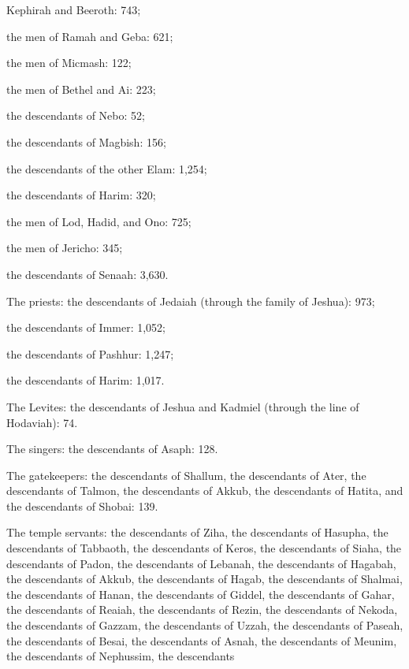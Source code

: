 {Kephirah
and Beeroth: 743;
\par }{\PP {}the men
of Ramah
and Geba: 621;
\par }{\PP {}the men
of Micmash: 122;
\par }{\PP {}the men
of Bethel
and Ai: 223;
\par }{\PP {}the descendants
of Nebo: 52;
\par }{\PP {}the descendants
of Magbish: 156;
\par }{\PP {}the descendants
of the other
Elam: 1,254;
\par }{\PP {}the descendants
of Harim: 320;
\par }{\PP {}the men
of Lod,
Hadid,
and Ono: 725;
\par }{\PP {}the men
of Jericho: 345;
\par }{\PP {}the descendants
of Senaah: 3,630.
\par }{\PP {}The priests: the descendants
of Jedaiah
(through the family
of Jeshua): 973;
\par }{\PP {}the descendants
of Immer: 1,052;
\par }{\PP {}the descendants
of Pashhur: 1,247;
\par }{\PP {}the descendants
of Harim: 1,017.
\par }{\PP {}The Levites: the descendants
of Jeshua
and Kadmiel
(through the line of Hodaviah): 74.
\par }{\PP {}The singers: the descendants
of Asaph: 128.
\par }{\PP {}The gatekeepers: the descendants
of Shallum,
the descendants
of Ater,
the descendants
of Talmon,
the descendants
of Akkub,
the descendants
of Hatita,
and the descendants
of Shobai: 139.
\par }{\PP {}The temple servants: the descendants
of Ziha,
the descendants
of Hasupha,
the descendants
of Tabbaoth,
the descendants
of Keros,
the descendants
of Siaha,
the descendants
of Padon,
the descendants
of Lebanah,
the descendants of
Hagabah,
the descendants of
Akkub,
the descendants
of Hagab,
the descendants of
Shalmai,
the descendants of
Hanan,
the descendants
of Giddel,
the descendants
of Gahar,
the descendants
of Reaiah,
the descendants
of Rezin,
the descendants
of Nekoda,
the descendants of
Gazzam,
the descendants
of Uzzah,
the descendants
of Paseah,
the descendants of
Besai,
the descendants
of Asnah,
the descendants
of Meunim,
the descendants
of Nephussim,
the descendants
}
